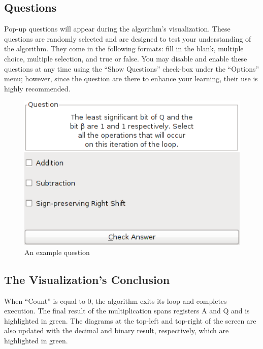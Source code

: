 \documentclass{article}
\begin{document}
\pagebreak

\subsection{Questions}

Pop-up questions will appear during the algorithm's visualization.
These questions are randomly selected and are designed to test your understanding of the algorithm.
They come in the following formats: fill in the blank, multiple choice, multiple selection, and true or false.
You may disable and enable these questions at any time using the ``Show Questions'' check-box under the ``Options'' menu; however, since the question are there to enhance your learning, their use is highly recommended.

\begin{figure}[h]
\centering
\includegraphics[scale=0.5]{que.pdf}
\caption{An example question}
\end{figure}

\pagebreak

\subsection{The Visualization's Conclusion}
When ``Count'' is equal to 0, the algorithm exits its loop and completes execution.
The final result of the multiplication spans registers A and Q and is highlighted in green.
The diagrams at the top-left and top-right of the screen are also updated with the decimal and binary result, respectively, which are highlighted in green.
\end{document}
